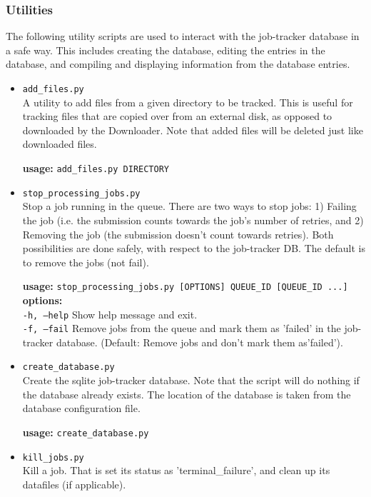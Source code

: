 \documentclass[12pt]{article}
\begin{document}
\subsubsection{Utilities}
The following utility scripts are used to interact with the job-tracker database in a safe way. This includes creating the database, editing the entries in the database, and compiling and displaying information from the database entries.
\begin{itemize}
    \item \texttt{add\_files.py} \hfill \\
        A utility to add files from a given directory to be tracked. This is useful for tracking files that are copied over from an external disk, as opposed to downloaded by the Downloader. Note that added files will be deleted just like downloaded files.

        \textbf{usage:} \texttt{add\_files.py DIRECTORY} \\

    \item \texttt{stop\_processing\_jobs.py} \hfill \\
        Stop a job running in the queue. There are two ways to stop jobs: 1) Failing the job (i.e. the submission counts towards the job's number of retries, and 2) Removing the job (the submission doesn't count towards retries). Both possibilities are done safely, with respect to the job-tracker DB. The default is to remove the jobs (not fail).

        \textbf{usage:} \texttt{stop\_processing\_jobs.py [OPTIONS] QUEUE\_ID [QUEUE\_ID ...]} \\
        \textbf{options:} \\
            \texttt{-h, --help}  Show help message and exit. \\
            \texttt{-f, --fail}  Remove jobs from the queue and mark them as 'failed' in the job-tracker database. (Default: Remove jobs and don't mark them as'failed').

    \item \texttt{create\_database.py} \hfill \\
        Create the sqlite job-tracker database. Note that the script will do nothing if the database already exists. The location of the database is taken from the database configuration file.

        \textbf{usage:} \texttt{create\_database.py}

    \item \texttt{kill\_jobs.py} \hfill \\
        Kill a job. That is set its status as 'terminal\_failure', and clean up its datafiles (if applicable).


\end{itemize}
\end{document}
